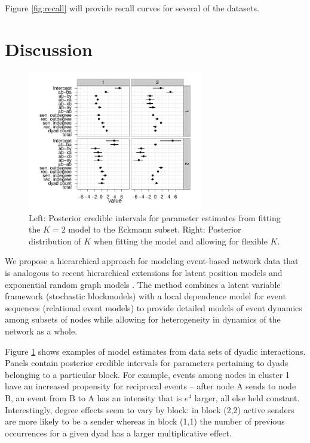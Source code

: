 \documentclass{article}
\begin{document}
Figure \ref{fig:recall} will provide recall curves for several of the datasets.

\section{Discussion}


\begin{figure}[t]
\includegraphics[width=3in]{../figs/eckmann-small/params-estimates}
\fbox{\rule[.5cm]{0cm}{5cm} \rule[.5cm]{5cm}{0cm}}
\caption{Left: Posterior credible intervals for parameter estimates from fitting the $K=2$ model to the Eckmann subset.  Right: Posterior distribution of $K$ when fitting the model and allowing for flexible $K$.}
\label{fig:posteriorparams}
\end{figure}

 We propose a hierarchical approach for modeling event-based network data that is analogous to recent hierarchical extensions for latent position models \cite{Handcock2007} and exponential random graph models \cite{Schweinberger2011}.  The method combines a latent variable framework (stochastic blockmodels) with a local dependence model for event sequences (relational event models) to provide detailed models of event dynamics among subsets of nodes while allowing for heterogeneity in dynamics of the network as a whole.

Figure \ref{fig:posteriorparams} shows examples of model estimates from data sets of dyadic interactions. Panels contain posterior credible intervals for parameters pertaining to dyads belonging to a particular block.  For example, events among nodes in cluster 1 have an increased propensity for reciprocal events -- after node A sends to node B, an event from B to A has an intensity that is $e^4$ larger, all else held constant.  Interestingly, degree effects seem to vary by block: in block (2,2) active senders are more likely to be a sender whereas in block (1,1) the number of previous occurrences for a given dyad has a larger multiplicative effect.  
\end{document}
